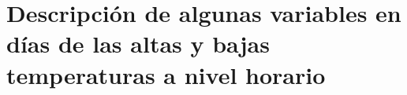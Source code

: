 \section{Descripción de algunas variables en días de las altas y bajas temperaturas a nivel horario}


%
%

